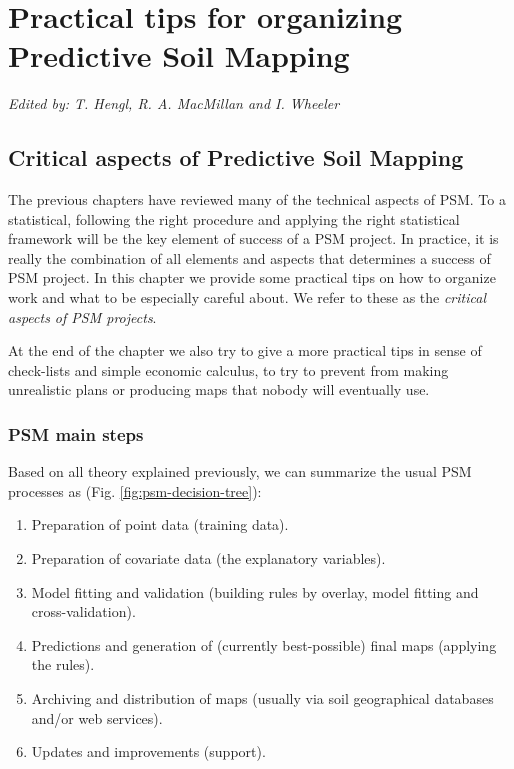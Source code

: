 \documentclass[graybox,natbib,nospthms,UStrade]{svmono}
\begin{document}
\hypertarget{practical-tips}{%
\chapter{Practical tips for organizing Predictive Soil Mapping}\label{practical-tips}}

\emph{Edited by: T. Hengl, R. A. MacMillan and I. Wheeler}

\hypertarget{critical-aspects-of-predictive-soil-mapping}{%
\section{Critical aspects of Predictive Soil Mapping}\label{critical-aspects-of-predictive-soil-mapping}}

The previous chapters have reviewed many of the technical aspects of PSM.
To a statistical, following the right procedure and applying the right statistical framework will be
the key element of success of a PSM project. In practice,
it is really the combination of all elements and aspects that determines a success of PSM project.
In this chapter we provide some practical tips on how to organize work and what to be especially
careful about. We refer to these as the \emph{critical aspects of PSM projects}.

At the end of the chapter we also try to give a more practical tips in sense of check-lists and
simple economic calculus, to try to prevent from making unrealistic plans or producing maps
that nobody will eventually use.

\hypertarget{psm-main-steps}{%
\subsection{PSM main steps}\label{psm-main-steps}}

Based on all theory explained previously, we can summarize the usual PSM processes as (Fig. \ref{fig:psm-decision-tree}):

\begin{enumerate}
\def\labelenumi{\arabic{enumi}.}
\item
  Preparation of point data (training data).
\item
  Preparation of covariate data (the explanatory variables).
\item
  Model fitting and validation (building rules by overlay, model fitting and cross-validation).
\item
  Predictions and generation of (currently best-possible) final maps
  (applying the rules).
\item
  Archiving and distribution of maps (usually via soil geographical
  databases and/or web services).
\item
  Updates and improvements (support).
\end{enumerate}
\end{document}
